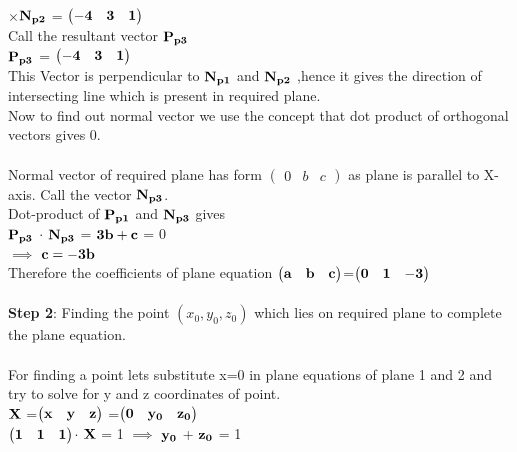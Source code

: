 \documentclass[twocolumn]{article}
\let\vec\mathbf
\begin{document}
\\\hspace*{1.5cm}{\bf$ \vec{N_{p1}}$}$\times$${\bf \vec{N_{p2}}}$ =  $\begin{pmatrix}{\bf-4}&{\bf3}&{\bf1}\end{pmatrix}$
\\Call the resultant vector ${\bf \vec{P_{p3}}}$
\\\hspace*{1.5cm}
${\bf \vec{P_{p3}}}$ = $\begin{pmatrix}{\bf-4}&{\bf3}&{\bf1}\end{pmatrix}$
\\This Vector is perpendicular to ${\bf \vec{N_{p1}}}$ and ${\bf \vec{N_{p2}}}$ ,hence it gives the direction of intersecting line  which is present in required plane. 
\\Now to find out normal vector we use the concept that dot product of orthogonal vectors gives 0.
\\
\\Normal vector of required plane has form $\begin{pmatrix}0&b&c\end{pmatrix}$ as plane is parallel to X-axis. Call the vector ${\bf \vec{N_{p3}}}$.
\\Dot-product of ${\bf \vec{P_{p1}}}$ and ${\bf \vec{N_{p3}}}$ gives
\\\hspace*{1.5cm}${\bf \vec{P_{p3}}}$ $\cdot$ ${\bf \vec{N_{p3}}}$ =  ${\bf \vec{3b}} + {\bf \vec{c}}$ = 0
\\\hspace*{1.9cm}$\implies$ ${\bf \vec{c}} = {\bf \vec{-3b}}$
\\Therefore the coefficients of plane equation $\begin{pmatrix}{\bf a}&{\bf b}&{\bf c}\end{pmatrix}$=$\begin{pmatrix}{\bf 0}&{\bf 1}&{\bf -3}\end{pmatrix}$
\\
\\\textbf{Step 2}: Finding the point $(x_{0},y_{0},z_{0})$ which lies on required plane to complete the plane equation.
\\
\\For finding a point lets substitute x=0 in plane equations of plane 1 and 2 and try to solve for y and z coordinates of point.
\\\hspace*{1.5cm} ${\bf \vec{X} }$ =$\begin{pmatrix}{\bf x}&{\bf y}&{\bf z}\end{pmatrix}$ =$\begin{pmatrix}{\bf 0}&{\bf y_{0}}&{\bf z_{0}}\end{pmatrix}$
\\\hspace*{0.5cm}$\begin{pmatrix}{\bf 1}&{\bf 1}&{\bf 1}\end{pmatrix}$$\cdot$ ${\bf \vec{X} }$ = 1 $\implies$ ${\bf \vec{y_{0}}}$ + ${\bf \vec{z_{0}}}$ = 1 
\end{document}
